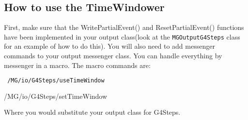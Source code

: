 \subsection{How to use the TimeWindower}

First, make sure that the WritePartialEvent() and ResetPartialEvent() functions have been implemented in your 
output class(look at the {\tt MGOutputG4Steps} class for an example of how to do
this).  You will also need to add messenger commands to your output messenger
class.  You can handle everything by messenger in a macro.  The macro commands
are:

{\tt
/MG/io/G4Steps/useTimeWindow

/MG/io/G4Steps/setTimeWindow
}

\noindent Where you would substitute your output class for G4Steps.

%  



